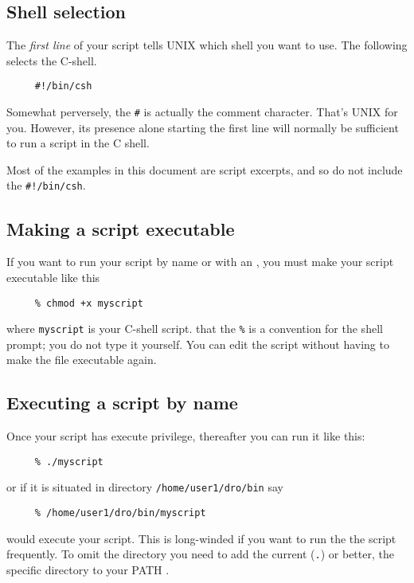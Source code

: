 \subsection{Shell selection\label{sc4_se_cshselect}}

The {\em first line\/} of your script tells UNIX which shell you want
to use.  The following selects the C-shell.

\small
\begin{verbatim}
     #!/bin/csh
\end{verbatim}
\normalsize
Somewhat perversely, the {\tt \#} is actually the comment character.
That's UNIX for you.  However, its presence alone starting the first
line will normally be sufficient to run a script in the C shell.

Most of the examples in this document are script excerpts, and so do not
include the \mbox{\tt \#!/bin/csh}.

\subsection{Making a script executable
\label{sc4_se_executable}}

If you want to run your script by name or with an , you must make your
script executable like this

\small
\begin{verbatim}
     % chmod +x myscript
\end{verbatim}
\normalsize
where {\tt myscript} is your C-shell script. 
that the {\tt \%} is a convention for the shell prompt; you do not type
it yourself.  You can edit the script without having to make the file
executable again.

\subsection{Executing a script by name
\label{sc4_se_by_name}}

Once your script has execute privilege, thereafter you can
run it like this:

\small
\begin{verbatim}
     % ./myscript
\end{verbatim}
\normalsize
or if it is situated in directory {\tt /home/user1/dro/bin} say

\small
\begin{verbatim}
     % /home/user1/dro/bin/myscript
\end{verbatim}
\normalsize
would execute your script.  This is long-winded if you want to run the
the script frequently.  To omit the directory  you need to add the current ({\tt{.}}) or better,
the specific directory to your PATH
.


